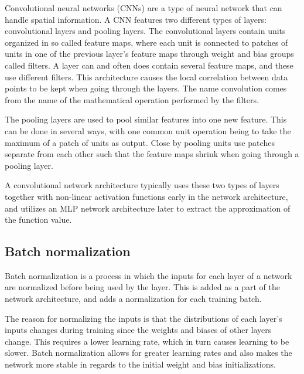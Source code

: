 \documentclass{kththesis}
\begin{document}
Convolutional neural networks (CNNs) are a type of neural network that can handle spatial information. A CNN features two different types of layers: convolutional layers and pooling layers. The convolutional layers contain units organized in so called feature maps, where each unit is connected to patches of units in one of the previous layer's feature maps through weight and bias groups called filters. A layer can and often does contain several feature maps, and these use different filters. This architecture causes the local correlation between data points to be kept when going through the layers. The name convolution comes from the name of the mathematical operation performed by the filters. \parencite{lecun2015deep}

The pooling layers are used to pool similar features into one new feature. This can be done in several ways, with one common unit operation being to take the maximum of a patch of units as output. Close by pooling units use patches separate from each other such that the feature maps shrink when going through a pooling layer. \parencite{lecun2015deep}

A convolutional network architecture typically uses these two types of layers together with non-linear activation functions early in the network architecture, and utilizes an MLP network architecture later to extract the approximation of the function value. \parencite{lecun2015deep}

\subsection{Batch normalization}
Batch normalization is a process in which the inputs for each layer of a network are normalized before being used by the layer. This is added as a part of the network architecture, and adds a normalization for each training batch.

The reason for normalizing the inputs is that the distributions of each layer's inputs changes during training since the weights and biases of other layers change. This requires a lower learning rate, which in turn causes learning to be slower. Batch normalization allows for greater learning rates and also makes the network more stable in regards to the initial weight and bias initializations. \parencite{ioffe2015batch}
\end{document}
